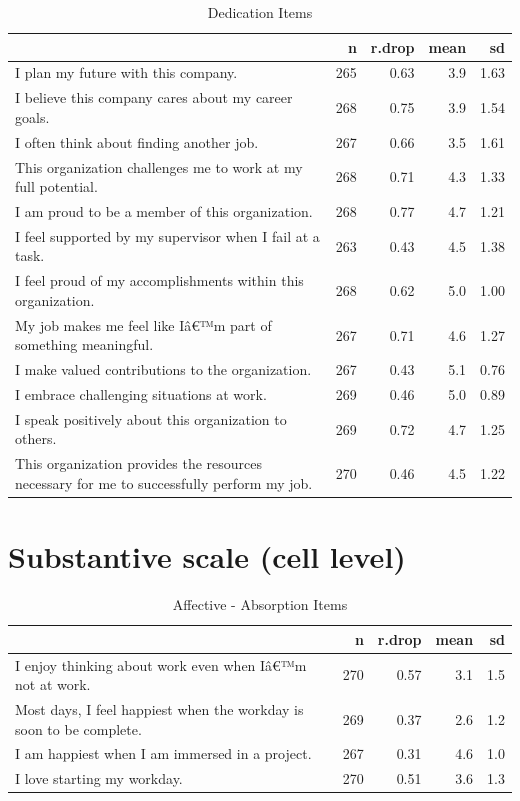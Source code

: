 \documentclass[
]{book}
\begin{document}
\begin{table}

\caption{\label{tab:rdrop6}Dedication Items}
\centering
\begin{tabular}[t]{l|r|r|r|r}
\hline
  & n & r.drop & mean & sd\\
\hline
I plan my future with this company. & 265 & 0.63 & 3.9 & 1.63\\
\hline
I believe this company cares about my career goals. & 268 & 0.75 & 3.9 & 1.54\\
\hline
I often think about finding another job. & 267 & 0.66 & 3.5 & 1.61\\
\hline
This organization challenges me to work at my full potential. & 268 & 0.71 & 4.3 & 1.33\\
\hline
I am proud to be a member of this organization. & 268 & 0.77 & 4.7 & 1.21\\
\hline
I feel supported by my supervisor when I fail at a task. & 263 & 0.43 & 4.5 & 1.38\\
\hline
I feel proud of my accomplishments within this organization. & 268 & 0.62 & 5.0 & 1.00\\
\hline
My job makes me feel like Iâ€™m part of something meaningful. & 267 & 0.71 & 4.6 & 1.27\\
\hline
I make valued contributions to the organization. & 267 & 0.43 & 5.1 & 0.76\\
\hline
I embrace challenging situations at work. & 269 & 0.46 & 5.0 & 0.89\\
\hline
I speak positively about this organization to others. & 269 & 0.72 & 4.7 & 1.25\\
\hline
This organization provides the resources necessary for me to successfully perform my job. & 270 & 0.46 & 4.5 & 1.22\\
\hline
\end{tabular}
\end{table}

\hypertarget{substantive-scale-cell-level}{%
\section{Substantive scale (cell level)}\label{substantive-scale-cell-level}}

\begin{table}

\caption{\label{tab:rdrop7}Affective - Absorption Items}
\centering
\begin{tabular}[t]{l|r|r|r|r}
\hline
  & n & r.drop & mean & sd\\
\hline
I enjoy thinking about work even when Iâ€™m not at work. & 270 & 0.57 & 3.1 & 1.5\\
\hline
Most days, I feel happiest when the workday is soon to be complete. & 269 & 0.37 & 2.6 & 1.2\\
\hline
I am happiest when I am immersed in a project. & 267 & 0.31 & 4.6 & 1.0\\
\hline
I love starting my workday. & 270 & 0.51 & 3.6 & 1.3\\
\hline
\end{tabular}
\end{table}
\end{document}

